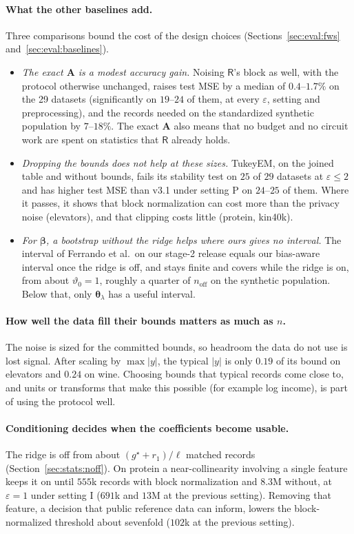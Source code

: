 \documentclass[11pt]{article}
\theoremstyle{definition}
\theoremstyle{plain}
\newcommand{\bbeta}{\boldsymbol{\beta}}
\newcommand{\btheta}{\boldsymbol{\theta}}
\newcommand{\bA}{\mathbf{A}}
\newcommand{\Party}[1]{\textsf{#1}}
\newcommand{\Rp}{\Party{R}}
\begin{document}
\paragraph{What the other baselines add.} Three comparisons bound the cost of the design choices (Sections~\ref{sec:eval:fws} and~\ref{sec:eval:baselines}).
\begin{itemize}[noitemsep]
  \item \emph{The exact $\bA$ is a modest accuracy gain.} Noising $\Rp$'s block as well, with the protocol otherwise unchanged, raises test MSE by a median of $0.4$--$1.7\%$ on the 29 datasets (significantly on $19$--$24$ of them, at every $\varepsilon$, setting and preprocessing), and the records needed on the standardized synthetic population by $7$--$18\%$. The exact $\bA$ also means that no budget and no circuit work are spent on statistics that $\Rp$ already holds.
  \item \emph{Dropping the bounds does not help at these sizes.} TukeyEM, on the joined table and without bounds, fails its stability test on $25$ of $29$ datasets at $\varepsilon \le 2$ and has higher test MSE than v3.1 under setting P on $24$--$25$ of them. Where it passes, it shows that block normalization can cost more than the privacy noise (elevators), and that clipping costs little (protein, kin40k).
  \item \emph{For $\bbeta$, a bootstrap without the ridge helps where ours gives no interval.} The interval of Ferrando et al.\ on our stage-2 release equals our bias-aware interval once the ridge is off, and stays finite and covers while the ridge is on, from about $\vartheta_0 = 1$, roughly a quarter of $n_{\mathrm{off}}$ on the synthetic population. Below that, only $\btheta_\lambda$ has a useful interval.
\end{itemize}

\paragraph{How well the data fill their bounds matters as much as $n$.} The noise is sized for the committed bounds, so headroom the data do not use is lost signal. After scaling by $\max|y|$, the typical $|y|$ is only $0.19$ of its bound on elevators and $0.24$ on wine. Choosing bounds that typical records come close to, and units or transforms that make this possible (for example log income), is part of using the protocol well.

\paragraph{Conditioning decides when the coefficients become usable.} The ridge is off from about $(g^\star + r_1)/\ell$ matched records (Section~\ref{sec:stats:noff}). On protein a near-collinearity involving a single feature keeps it on until $555$k records with block normalization and $8.3$M without, at $\varepsilon = 1$ under setting I ($691$k and $13$M at the previous setting). Removing that feature, a decision that public reference data can inform, lowers the block-normalized threshold about sevenfold ($102$k at the previous setting).
\end{document}
